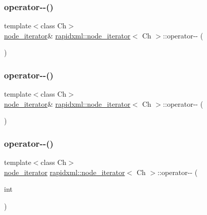 \subsubsection{\texorpdfstring{operator-\/-\/()}{operator--()}\hspace{0.1cm}{\footnotesize\ttfamily [1/4]}}
{\footnotesize\ttfamily template$<$class Ch$>$ \\
\mbox{\hyperlink{classrapidxml_1_1node__iterator}{node\+\_\+iterator}}\& \mbox{\hyperlink{classrapidxml_1_1node__iterator}{rapidxml\+::node\+\_\+iterator}}$<$ Ch $>$\+::operator-\/-\/ (\begin{DoxyParamCaption}{ }\end{DoxyParamCaption})\hspace{0.3cm}{\ttfamily [inline]}}

\mbox{\label{classrapidxml_1_1node__iterator_ace52107ecd1bcf02e49619e86206e3a3}} 
\subsubsection{\texorpdfstring{operator-\/-\/()}{operator--()}\hspace{0.1cm}{\footnotesize\ttfamily [2/4]}}
{\footnotesize\ttfamily template$<$class Ch$>$ \\
\mbox{\hyperlink{classrapidxml_1_1node__iterator}{node\+\_\+iterator}}\& \mbox{\hyperlink{classrapidxml_1_1node__iterator}{rapidxml\+::node\+\_\+iterator}}$<$ Ch $>$\+::operator-\/-\/ (\begin{DoxyParamCaption}{ }\end{DoxyParamCaption})\hspace{0.3cm}{\ttfamily [inline]}}

\mbox{\label{classrapidxml_1_1node__iterator_a4ca35716bb7865f199a137b063af6080}} 
\subsubsection{\texorpdfstring{operator-\/-\/()}{operator--()}\hspace{0.1cm}{\footnotesize\ttfamily [3/4]}}
{\footnotesize\ttfamily template$<$class Ch$>$ \\
\mbox{\hyperlink{classrapidxml_1_1node__iterator}{node\+\_\+iterator}} \mbox{\hyperlink{classrapidxml_1_1node__iterator}{rapidxml\+::node\+\_\+iterator}}$<$ Ch $>$\+::operator-\/-\/ (\begin{DoxyParamCaption}\item[{int}]{ }\end{DoxyParamCaption})\hspace{0.3cm}{\ttfamily [inline]}}

